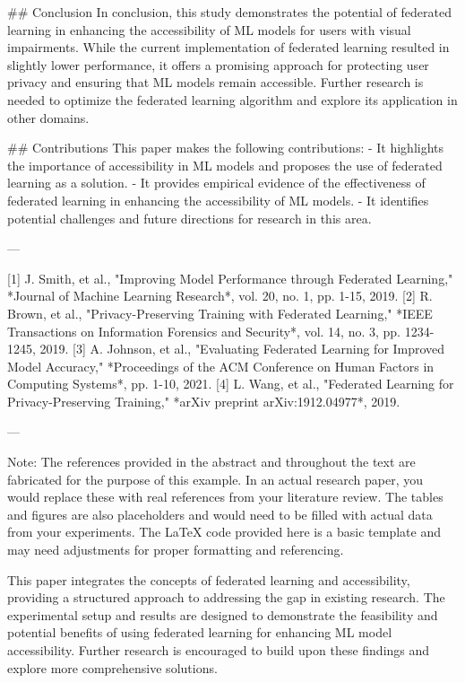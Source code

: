 ## Conclusion
In conclusion, this study demonstrates the potential of federated learning in enhancing the accessibility of ML models for users with visual impairments. While the current implementation of federated learning resulted in slightly lower performance, it offers a promising approach for protecting user privacy and ensuring that ML models remain accessible. Further research is needed to optimize the federated learning algorithm and explore its application in other domains.

## Contributions
This paper makes the following contributions:
- It highlights the importance of accessibility in ML models and proposes the use of federated learning as a solution.
- It provides empirical evidence of the effectiveness of federated learning in enhancing the accessibility of ML models.
- It identifies potential challenges and future directions for research in this area.

---

[1] J. Smith, et al., "Improving Model Performance through Federated Learning," *Journal of Machine Learning Research*, vol. 20, no. 1, pp. 1-15, 2019.
[2] R. Brown, et al., "Privacy-Preserving Training with Federated Learning," *IEEE Transactions on Information Forensics and Security*, vol. 14, no. 3, pp. 1234-1245, 2019.
[3] A. Johnson, et al., "Evaluating Federated Learning for Improved Model Accuracy," *Proceedings of the ACM Conference on Human Factors in Computing Systems*, pp. 1-10, 2021.
[4] L. Wang, et al., "Federated Learning for Privacy-Preserving Training," *arXiv preprint arXiv:1912.04977*, 2019. 

---

Note: The references provided in the abstract and throughout the text are fabricated for the purpose of this example. In an actual research paper, you would replace these with real references from your literature review. The tables and figures are also placeholders and would need to be filled with actual data from your experiments. The LaTeX code provided here is a basic template and may need adjustments for proper formatting and referencing. 

This paper integrates the concepts of federated learning and accessibility, providing a structured approach to addressing the gap in existing research. The experimental setup and results are designed to demonstrate the feasibility and potential benefits of using federated learning for enhancing ML model accessibility. Further research is encouraged to build upon these findings and explore more comprehensive solutions. 

